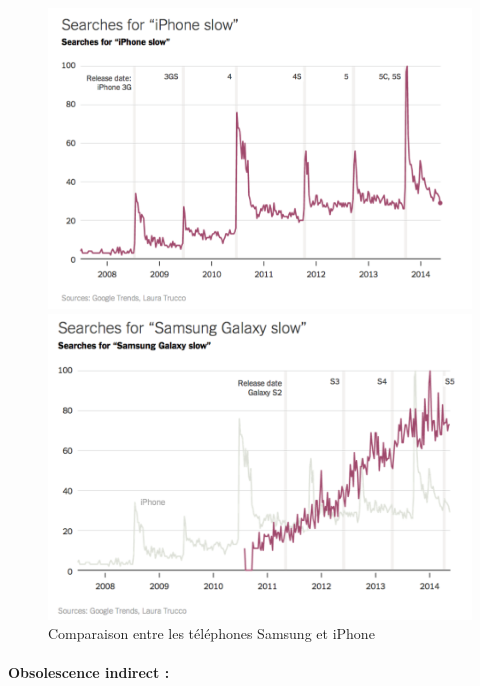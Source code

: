 \begin{figure}[h]

\begin{minipage}{0.5\linewidth}
\includegraphics[scale=0.25]{Rsc/searchForIphoneSlow.png} 
\end{minipage}
\begin{minipage}{0.5\linewidth}
\includegraphics[scale=0.25]{Rsc/searchForSamsungSlow.png} 
\end{minipage}
\caption{Comparaison entre les téléphones Samsung et iPhone}
\label{compSamsIph}
\end{figure}

\paragraph*{Obsolescence indirect :}


